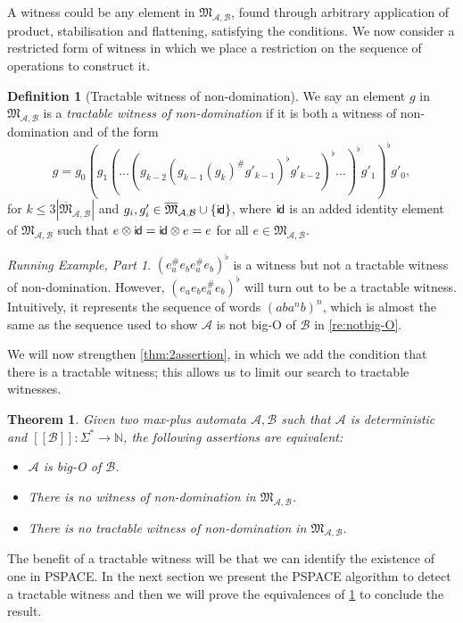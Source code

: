 \documentclass[10pt,a4paper]{amsart}
\newtheorem{thm}{Theorem}[section]
\theoremstyle{definition}
\newtheorem{defi}[defi]{Definition}
\numberwithin{equation}{section}
\theoremstyle{remark}
\newcommand{\N}{\mathbb{N}}
\newcommand{\ideal}{\mathfrak{M}}
\newcommand{\autA}{\mathcal{A}}
\newcommand{\autB}{\mathcal{B}}
\newcommand{\brfunc}[1]{[\![#1]\!]}
\newcommand{\funcB}{\brfunc{\autB}}
\newcommand{\monoidid}{\mathsf{i\kern-0.8pt d}}
\theoremstyle{remark}
\newtheorem{runningexample/}{Running Example, Part}
\newenvironment{runningexample}
  {\renewcommand{\qedsymbol}{\color{darkgray}\ensuremath{\lrcorner}}%
   \pushQED{\qed}\begin{runningexample/}}
  {\popQED\end{runningexample/}}
\begin{document}
A witness could be any element in $\ideal_{\autA,\autB}$, found through arbitrary application of product, stabilisation and flattening, satisfying the conditions. We now consider a restricted form of witness in which we place a restriction on the sequence of operations to construct it. 
\begin{defi}[Tractable witness of non-domination]\label{def:tractable_witness}
We say an element $g$ in $\ideal_{\autA,\autB}$ is a \emph{tractable witness of non-domination} if it is both a witness of non-domination and of the form \[g = g_0 (g_1 (\dots (g_{k-2} ( g_{k-1} (g_{k})^\#g'_{k-1})^\flat g'_{k-2})^\flat \dots)^\flat g'_{1})^\flat g'_{0},\] for $k \le 3|\overline{\ideal}_{\autA,\autB}|$ and $g_i, g'_i \in \overline{\ideal}_{\autA,\autB}\cup\{\monoidid\}$, where $\monoidid$ is an added identity element of $\ideal_{\autA,\autB}$ such that $e\otimes \monoidid = \monoidid \otimes e = e$ for all $e\in \ideal_{\autA,\autB}$.
\end{defi}
\begin{runningexample}\label{re:actualtractablewitness}
$(e_a^\#e_be_a^\#e_b)^\flat$ is a witness but not a tractable witness of non-domination. However, $(e_ae_be_a^\#e_b)^\flat$ will turn out to be a tractable witness. Intuitively, it represents the sequence of words $(aba^nb)^n$, which is almost the same as the sequence used to show $\autA$ is not big-O of $\autB$ in \cref{re:notbig-O}.
\end{runningexample}

We will now strengthen \cref{thm:2assertion}, in which we add the condition that there is a tractable witness;  this allows us to limit our search to tractable witnesses.
\begin{thm}\label{thm:3assertion}
Given two max-plus automata $\autA,\autB$ such that $\autA$ is deterministic and $\funcB:\Sigma^* \to \N$, the following assertions are equivalent:
\begin{itemize}
\item $\autA$ is big-O of $\autB$.
\item There is no witness of non-domination in $\ideal_{\autA,\autB}$.
\item There is no tractable witness of non-domination in $\ideal_{\autA,\autB}$.
\end{itemize}
\end{thm}
The benefit of a tractable witness will be that we can identify the existence of one in PSPACE. In the next section we present the PSPACE algorithm to detect a tractable witness and then we will prove the equivalences of \cref{thm:3assertion} to conclude the result.
\end{document}

